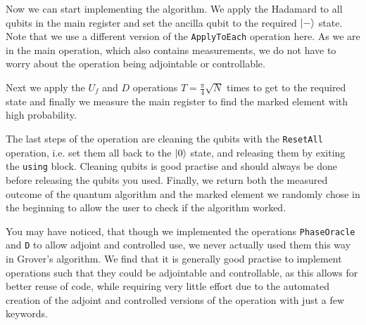 

Now we can start implementing the algorithm. We apply the Hadamard to all qubits in the main register and set the ancilla qubit to the required $\left\vert{-}\right\rangle$ state. Note that we use a different version of the \texttt{ApplyToEach} operation here. As we are in the main operation, which also contains measurements, we do not have to worry about the operation being adjointable or controllable. 

Next we apply the $U_f$ and $D$ operations $T = \frac{\pi}{4}\sqrt{N}$ times to get to the required state and finally we measure the main register to find the marked element with high probability.



The last steps of the operation are cleaning the qubits with the \texttt{ResetAll} operation, i.e. set them all back to the $\left\vert{0}\right\rangle$ state, and releasing them by exiting the \texttt{using} block. Cleaning qubits is good practise and should always be done before releasing the qubits you used. Finally, we return both the measured outcome of the quantum algorithm and the marked element we randomly chose in the beginning to allow the user to check if the algorithm worked. 



You may have noticed, that though we implemented the operations \texttt{PhaseOracle} and \texttt{D} to allow adjoint and controlled use, we never actually used them this way in Grover's algorithm. We find that it is generally good practise to implement operations such that they could be adjointable and controllable, as this allows for better reuse of code, while requiring very little effort due to the automated creation of the adjoint and controlled versions of the operation with just a few keywords.

